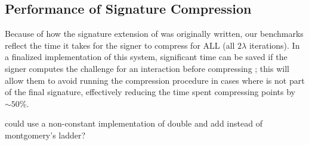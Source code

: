 \subsection{Performance of Signature Compression}

Because of how the signature extension of \sidh was originally written, our benchmarks reflect the time it takes for the signer to compress  for ALL  (all $2\lambda$ iterations). In a finalized implementation of this system, significant time can be saved if the signer computes the challenge for an interaction before compressing ; this will allow them to avoid running the compression procedure in cases where  is not part of the final signature, effectively reducing the time spent compressing points by $\sim50\%$.

could use a non-constant implementation of double and add instead of montgomery's ladder? 

